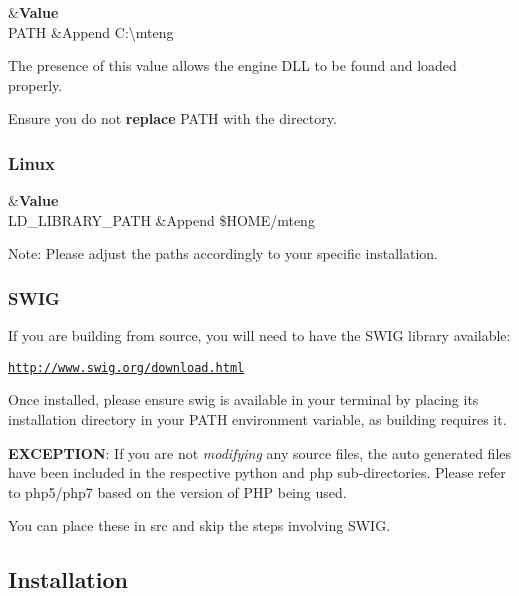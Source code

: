 \begin{TabularC}{2}
\hline
{}&{\bf Value}\\
{\ttfamily P\-A\-T\-H} &Append {\ttfamily C\-:\textbackslash{}mteng} \\
\end{TabularC}


The presence of this value allows the engine D\-L\-L to be found and loaded properly.

Ensure you do not {\bfseries replace} {\ttfamily P\-A\-T\-H} with the directory.

\subsubsection*{Linux}

\begin{TabularC}{2}
\hline
{}&{\bf Value}\\
{\ttfamily L\-D\-\_\-\-L\-I\-B\-R\-A\-R\-Y\-\_\-\-P\-A\-T\-H} &Append {\ttfamily \$\-H\-O\-M\-E/mteng} \\
\end{TabularC}


Note\-: Please adjust the paths accordingly to your specific installation.

\subsubsection*{S\-W\-I\-G}

If you are building from source, you will need to have the S\-W\-I\-G library available\-:

\href{http://www.swig.org/download.html}{\tt http\-://www.\-swig.\-org/download.\-html}

Once installed, please ensure {\ttfamily swig} is available in your terminal by placing its installation directory in your {\ttfamily P\-A\-T\-H} environment variable, as building requires it.

{\bfseries E\-X\-C\-E\-P\-T\-I\-O\-N}\-: If you are not {\itshape modifying} any source files, the auto generated files have been included in the respective {\ttfamily python} and {\ttfamily php} sub-\/directories. Please refer to php5/php7 based on the version of P\-H\-P being used.

You can place these in {\ttfamily src} and skip the steps involving S\-W\-I\-G.

\subsection*{Installation}

